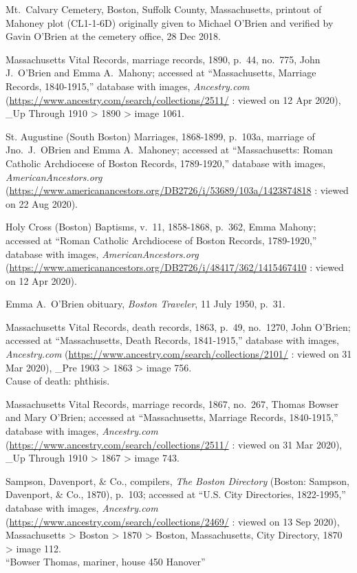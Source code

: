 \begin{thebibliography}{999}
Mt.\ Calvary Cemetery, Boston, Suffolk County, Massachusetts, printout of Mahoney plot (CL1-1-6D) originally given to Michael O'Brien and verified by Gavin O'Brien at the cemetery office, 28 Dec 2018.

Massachusetts Vital Records, marriage records, 1890, p.\ 44, no.\ 775, John J.\ O'Brien and Emma A.\ Mahony; accessed at ``Massachusetts, Marriage Records, 1840-1915,'' database with images, \textit{Ancestry.com} (\url{https://www.ancestry.com/search/collections/2511/} : viewed on 12 Apr 2020), \_Up Through 1910 > 1890 > image 1061.

St. Augustine (South Boston) Marriages, 1868-1899, p.\ 103a, marriage of Jno.\ J.\ OBrien and Emma A.\ Mahoney; accessed at ``Massachusetts: Roman Catholic Archdiocese of Boston Records, 1789-1920,'' database with images, \textit{AmericanAncestors.org} (\url{https://www.americanancestors.org/DB2726/i/53689/103a/1423874818} : viewed on 22 Aug 2020).

Holy Cross (Boston) Baptisms, v.\ 11, 1858-1868, p.\ 362, Emma Mahony; accessed at ``Roman Catholic Archdiocese of Boston Records, 1789-1920,'' database with images, \textit{AmericanAncestors.org} (\url{https://www.americanancestors.org/DB2726/i/48417/362/1415467410} : viewed on 12 Apr 2020).

Emma A.\ O'Brien obituary, \textit{Boston Traveler}, 11 July 1950, p.\ 31.

Massachusetts Vital Records, death records, 1863, p.\ 49, no.\ 1270, John O'Brien; accessed at ``Massachusetts, Death Records, 1841-1915,'' database with images, \textit{Ancestry.com} (\url{https://www.ancestry.com/search/collections/2101/} : viewed on 31 Mar 2020), \_Pre 1903 > 1863 > image 756.\\
Cause of death: phthisis.

Massachusetts Vital Records, marriage records, 1867, no.\ 267, Thomas Bowser and Mary O'Brien; accessed at ``Massachusetts, Marriage Records, 1840-1915,'' database with images, \textit{Ancestry.com} (\url{https://www.ancestry.com/search/collections/2511/} : viewed on 31 Mar 2020), \_Up Through 1910 > 1867 > image 743.

Sampson, Davenport, \& Co., compilers, \textit{The Boston Directory} (Boston: Sampson, Davenport, \& Co., 1870), p.\ 103; accessed at ``U.S. City Directories, 1822-1995,'' database with images, \textit{Ancestry.com} (\url{https://www.ancestry.com/search/collections/2469/} : viewed on 13 Sep 2020), Massachusetts > Boston > 1870 > Boston, Massachusetts, City Directory, 1870 > image 112.\\
``Bowser Thomas, mariner, house 450 Hanover''


\end{thebibliography}
